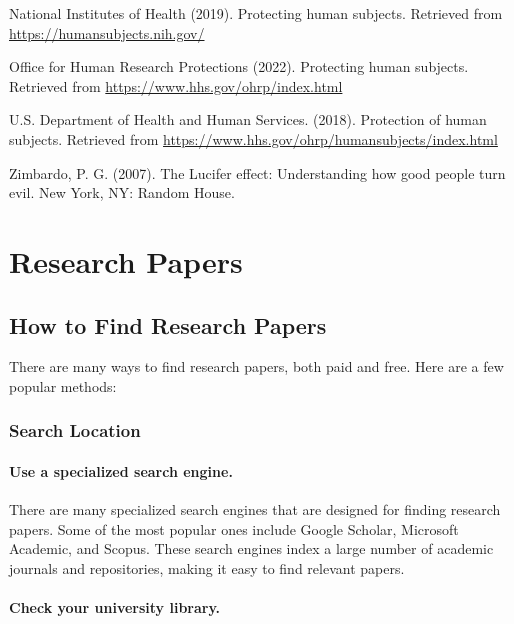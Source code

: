 \documentclass[
  b5paper]{book}
\begin{document}
National Institutes of Health (2019). Protecting human subjects. Retrieved from \url{https://humansubjects.nih.gov/}

Office for Human Research Protections (2022). Protecting human subjects. Retrieved from \url{https://www.hhs.gov/ohrp/index.html}

U.S. Department of Health and Human Services. (2018). Protection of human subjects. Retrieved from \url{https://www.hhs.gov/ohrp/humansubjects/index.html}

Zimbardo, P. G. (2007). The Lucifer effect: Understanding how good people turn evil. New York, NY: Random House.

\hypertarget{research-papers-1}{%
\chapter{Research Papers}\label{research-papers-1}}

\hypertarget{find}{%
\section{How to Find Research Papers}\label{find}}

There are many ways to find research papers, both paid and free. Here are a few popular methods:

\hypertarget{search-location}{%
\subsection*{Search Location}\label{search-location}}

\hypertarget{use-a-specialized-search-engine.}{%
\subsubsection*{Use a specialized search engine.}\label{use-a-specialized-search-engine.}}

There are many specialized search engines that are designed for finding research papers. Some of the most popular ones include Google Scholar, Microsoft Academic, and Scopus. These search engines index a large number of academic journals and repositories, making it easy to find relevant papers.

\hypertarget{check-your-university-library.}{%
\subsubsection*{Check your university library.}\label{check-your-university-library.}}
\end{document}
